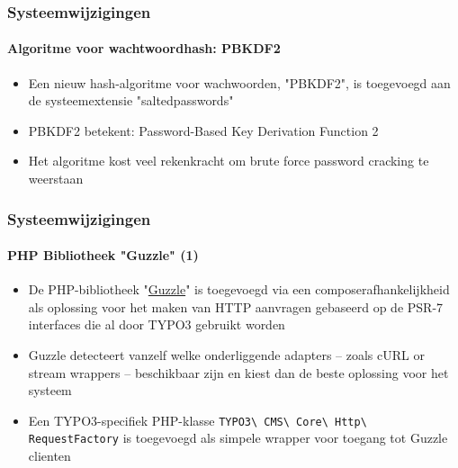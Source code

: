 \begin{frame}[fragile]
	\frametitle{Systeemwijzigingen}
	\framesubtitle{Algoritme voor wachtwoordhash: PBKDF2}

	\begin{itemize}

		\item Een nieuw hash-algoritme voor wachwoorden, "PBKDF2", is toegevoegd aan de systeemextensie "saltedpasswords"

		\item PBKDF2 betekent: Password-Based Key Derivation Function 2

		\item Het algoritme kost veel rekenkracht om brute force password cracking te weerstaan

	\end{itemize}

\end{frame}

\begin{frame}[fragile]
	\frametitle{Systeemwijzigingen}
	\framesubtitle{PHP Bibliotheek "Guzzle" (1)}

	\begin{itemize}

		\item De PHP-bibliotheek
			"\href{http://docs.guzzlephp.org}{Guzzle}"
			is toegevoegd via een composerafhankelijkheid als oplossing voor het
			maken van HTTP aanvragen gebaseerd op de PSR-7 interfaces die al
			door TYPO3 gebruikt worden

		\item Guzzle detecteert vanzelf welke onderliggende adapters -- zoals
		 	cURL or stream wrappers -- beschikbaar zijn en kiest dan de beste
		 	oplossing voor het systeem

		\item Een TYPO3-specifiek PHP-klasse
			\texttt{TYPO3\textbackslash
				CMS\textbackslash
				Core\textbackslash
				Http\textbackslash
				RequestFactory}\newline
			is toegevoegd als simpele wrapper voor toegang tot Guzzle clienten

	\end{itemize}

\end{frame}


